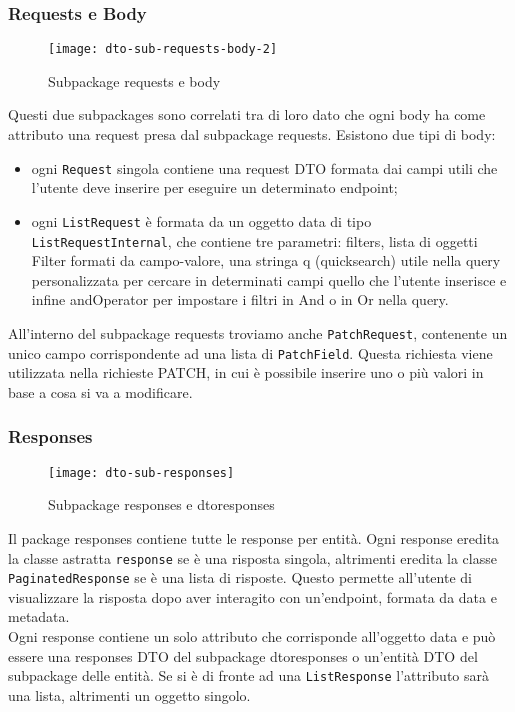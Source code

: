 \subsubsection{Requests e Body}
\begin{figure}[H] 
    \centering 
    \texttt{[image: dto-sub-requests-body-2]} 
    \caption{Subpackage requests e body}
\end{figure}
Questi due subpackages sono correlati tra di loro dato che ogni body ha come attributo una request presa dal subpackage requests.
Esistono due tipi di body:
\begin{itemize}
\item ogni \texttt{Request} singola contiene una request DTO formata dai campi utili che l'utente deve inserire per eseguire un determinato endpoint;
\item ogni \texttt{ListRequest} è formata da un oggetto data di tipo \texttt{ListRequestInternal}, che contiene tre parametri: filters, lista di oggetti Filter formati da campo-valore, una stringa q (quicksearch) utile nella query personalizzata per cercare in determinati campi quello che l'utente inserisce e infine andOperator per impostare i filtri in And o in Or nella query. 
\end{itemize}
All'interno del subpackage requests troviamo anche \texttt{PatchRequest}, contenente un unico campo corrispondente ad una lista di \texttt{PatchField}. Questa richiesta viene utilizzata nella richieste PATCH, in cui è possibile inserire uno o più valori in base a cosa si va a modificare.

\subsubsection{Responses}
\begin{figure}[H] 
    \centering 
    \texttt{[image: dto-sub-responses]} 
    \caption{Subpackage responses e dtoresponses}
\end{figure}
Il package responses contiene tutte le response per entità. Ogni response eredita la classe astratta \texttt{response} se è una risposta singola, altrimenti eredita la classe \texttt{PaginatedResponse} se è una lista di risposte. Questo permette all'utente di visualizzare la risposta dopo aver interagito con un'endpoint, formata da data e metadata.\\
Ogni response contiene un solo attributo che corrisponde all'oggetto data e può essere una responses DTO del subpackage dtoresponses o un'entità DTO del subpackage delle entità. Se si è di fronte ad una \texttt{ListResponse} l'attributo sarà una lista, altrimenti un oggetto singolo.